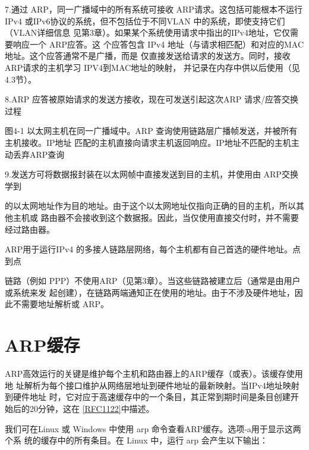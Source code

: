 7.通过 ARP，同一广播域中的所有系统可接收 ARP请求。这包括可能根本不运行IPv4
或IPv6协议的系统，但不包括位于不同VLAN 中的系统，即使支持它们（VLAN详细信息
见第3章）。如果某个系统使用请求中指出的IPv4地址，它仅需要响应一个 ARP应答。这
个应答包含 IPv4 地址（与请求相匹配）和对应的MAC地址。这个应答通常不是广播，而是
仅直接发送给请求的发送方。同时，接收ARP请求的主机学习 IPV4到MAC地址的映射，
并记录在内存中供以后使用（见4.3节）。

8.ARP 应答被原始请求的发送方接收，现在可发送引起这次ARP 请求/应答交换过程

图4-1 以太网主机在同一广播域中。ARP 查询使用链路层广播帧发送，并被所有主机接收。IP地址
匹配的主机直接向请求主机返回响应。IP地址不匹配的主机主动丢弃ARP查询

9.发送方可将数据报封装在以太网帧中直接发送到目的主机，并使用由 ARP交换学到

的以太网地址作为目的地址。由于这个以太网地址仅指向正确的目的主机，所以其他主机或
路由器不会接收到这个数据报。因此，当仅使用直接交付时，并不需要经过路由器。

ARP用于运行IPv4 的多接人链路层网络，每个主机都有自己首选的硬件地址。点到点

链路（例如 PPP）不使用ARP（见第3章）。当这些链路被建立后（通常是由用户或系统来发
起创建），在链路两端通知正在使用的地址。由于不涉及硬件地址，因此不需要地址解析或
ARP。

\section{ARP缓存}

ARP高效运行的关键是维护每个主机和路由器上的ARP缓存（或表）。该缓存使用地
址解析为每个接口维护从网络层地址到硬件地址的最新映射。当IPv4地址映射到硬件地址
时，它对应于高速缓存中的一个条目，其正常到期时间是条目创建开始后的20分钟，这在
\href{https://www.rfc-editor.org/rfc/rfc1122}{[RFC1122]}中描述。

我们可在Linux 或 Windows 中使用 arp 命令查看ARP缓存。选项-a用于显示这两个系
统的缓存中的所有条目。在 Linux 中，运行 arp 会产生以下输出：

